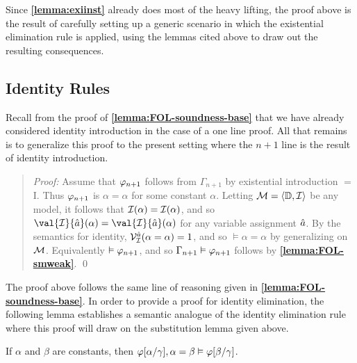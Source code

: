 Since \textbf{\ref{lemma:exiinst}} already does most of the heavy lifting, the proof above is the result of carefully setting up a generic scenario in which the existential elimination rule is applied, using the lemmas cited above to draw out the resulting consequences.



\subsection{Identity Rules}%
  \label{sub:IdentityRules}

Recall from the proof of \textbf{\ref{lemma:FOL-soundness-base}} that we have already considered identity introduction in the case of a one line proof.
All that remains is to generalize this proof to the present setting where the $n+1$ line is the result of identity introduction. 
  


\begin{quote} 
  \textit{Proof:} Assume that $\varphi_{n+1}$ follows from $\Gamma_{n+1}$ by existential introduction $=$I.
  Thus $\varphi_{n+1}$ is $\alpha=\alpha$ for some constant $\alpha$. 
  Letting $\mathcal{M}=\langle\mathbb{D},\mathcal{I}\rangle$ be any model, it follows that $\mathcal{I}(\alpha)=\mathcal{I}(\alpha)$, and so $\val{\I}{\va{a}}(\alpha)=\val{\I}{\va{a}}(\alpha)$ for any variable assignment $\hat{a}$.
  By the semantics for identity, $\mathcal{V}_{\mathcal{I}}^{\hat{a}}(\alpha=\alpha)=1$, and so $\vDash \alpha=\alpha$ by generalizing on $\mathcal{M}$.
  Equivalently $\vDash \varphi_{n+1}$, and so $\Gamma_{n+1}\vDash\varphi_{n+1}$ follows by \textbf{\ref{lemma:FOL-smweak}}.
  \qed
\end{quote}

The proof above follows the same line of reasoning given in \textbf{\ref{lemma:FOL-soundness-base}}.
In order to provide a proof for identity elimination, the following lemma establishes a semantic analogue of the identity elimination rule where this proof will draw on the substitution lemma given above.




\begin{Lthm} \label{lemma:id}
  If $\alpha$ and $\beta$ are constants, then $\varphi[\alpha/\gamma], \alpha = \beta \vDash \varphi[\beta/\gamma]$.
\end{Lthm}

